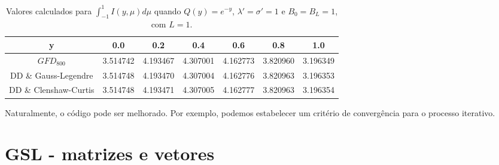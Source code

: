 \begin{table}[ht]
\centering
\caption{Valores calculados para $\int_{-1}^1I(y,\mu)d\mu$ quando $Q\left(y\right)=e^{-y}$, $\lambda'=\sigma'=1$ e $B_0=B_L=1$, com $L=1$.}{\vspace{0.1cm}}
\label{tab1}
\begin{tabular}{|c|c|c|c|c|c|c|}
\hline
y           & 0.0      & 0.2      & 0.4      & 0.6      & 0.8      & 1.0      \\ \hline
$GFD_{800}$ & 3.514742 & 4.193467 & 4.307001 & 4.162773 & 3.820960 & 3.196349 \\ \hline
DD \& Gauss-Legendre         & 3.514748 & 4.193470 & 4.307004 & 4.162776 & 3.820963 & 3.196353 \\ \hline
DD \& Clenshaw-Curtis         & 3.514748 & 4.193471 & 4.307005 & 4.162777 & 3.820963 & 3.196354 \\ \hline
\end{tabular}
\end{table}

Naturalmente, o código pode ser melhorado. Por exemplo, podemos estabelecer um critério de convergência para o processo iterativo.  

\section{GSL - matrizes e vetores}

